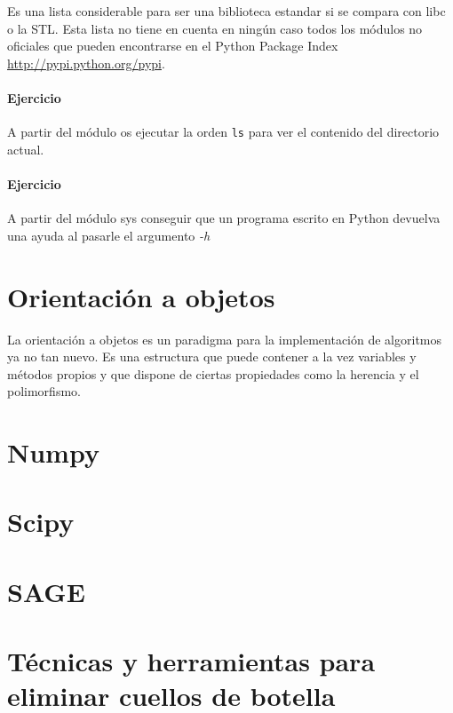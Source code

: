 \documentclass[a4paper,10pt]{article}
\begin{document}
Es una lista considerable para ser una biblioteca estandar si se
compara con libc o la STL.  Esta lista no tiene en cuenta en ningún
caso todos los módulos no oficiales que pueden encontrarse en el
Python Package Index \url{http://pypi.python.org/pypi}.

\begin{small}
  \paragraph*{Ejercicio}
  A partir del módulo os ejecutar la orden \texttt{ls} para ver el
  contenido del directorio actual.
\end{small}

\begin{small}
  \paragraph*{Ejercicio}
  A partir del módulo sys conseguir que un programa escrito en Python
  devuelva una ayuda al pasarle el argumento \emph{-h}
\end{small}

\section{Orientación a objetos}

La orientación a objetos es un paradigma para la implementación de
algoritmos ya no tan nuevo.  Es una estructura que puede contener a la
vez variables y métodos propios y que dispone de ciertas propiedades
como la herencia y el polimorfismo.


\section{Numpy}

\section{Scipy}

\section{SAGE}

\section{Técnicas y herramientas para eliminar cuellos de botella}
\end{document}
